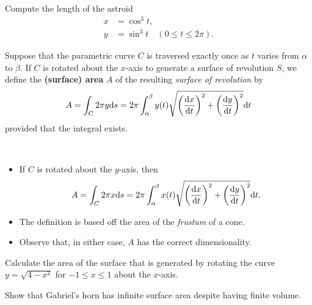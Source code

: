 \begin{example}
Compute the length of the astroid
\begin{align*}
x &= \cos^3 t,\\
y &= \sin^3 t\quad (0\le t\le 2\pi).
\end{align*}
\end{example}

\newpage



\begin{definition}
Suppose that the parametric curve $C$ is traversed exactly once as $t$ varies from $\alpha$ to $\beta$.
If $C$ is rotated about the $x$-axis to generate a surface of revolution $S$, we define the \textbf{(surface) area} $A$ of the resulting \textit{surface of revolution} by
\begin{equation*}
A = \int_C 2\pi y\mathrm{d} s =2\pi \int_\alpha^\beta y(t)\sqrt{\left(\frac{\mathrm{d} x}{\mathrm{d} t}\right)^2 + \left(\frac{\mathrm{d} y}{\mathrm{d} t}\right)^2}\mathrm{d} t
\end{equation*}
provided that the integral exists.
\end{definition}

\begin{remark}\,
\begin{itemize}
\item If $C$ is rotated about the $y$-axis, then 
\begin{equation*}
A = \int_C 2\pi x\mathrm{d} s =2\pi \int_\alpha^\beta x(t)\sqrt{\left(\frac{\mathrm{d} x}{\mathrm{d} t}\right)^2 + \left(\frac{\mathrm{d} y}{\mathrm{d} t}\right)^2}\mathrm{d} t.
\end{equation*}
\item The definition is based off the area of the \textit{frustum} of a cone.
\item Observe that, in either case, $A$ has the correct dimensionality.
\end{itemize}
\end{remark}

\begin{example}
Calculate the area of the surface that is generated by rotating the curve $y=\sqrt{4-x^2}$ for $-1\le x\le 1$ about the $x$-axis.
\end{example}

\newpage

\begin{example}
Show that Gabriel's horn has infinite surface area despite having finite volume.
\end{example}

